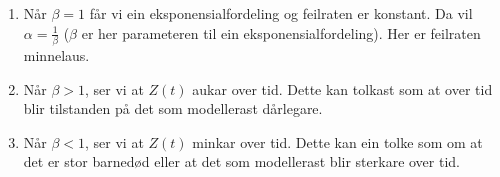 \begin{enumerate}
    \item Når $\beta = 1$ får vi ein eksponensialfordeling og feilraten er konstant. Da vil $\alpha = \frac{1}{\beta}$ ($\beta$ er her parameteren til ein eksponensialfordeling). Her er feilraten minnelaus.
    \item Når $\beta > 1$, ser vi at $Z(t)$ aukar over tid. Dette kan tolkast som at over tid blir tilstanden på det som modellerast dårlegare.
    \item Når $\beta < 1$, ser vi at $Z(t)$ minkar over tid. Dette kan ein tolke som om at det er stor barnedød eller at det som modellerast blir sterkare over tid.
\end{enumerate}